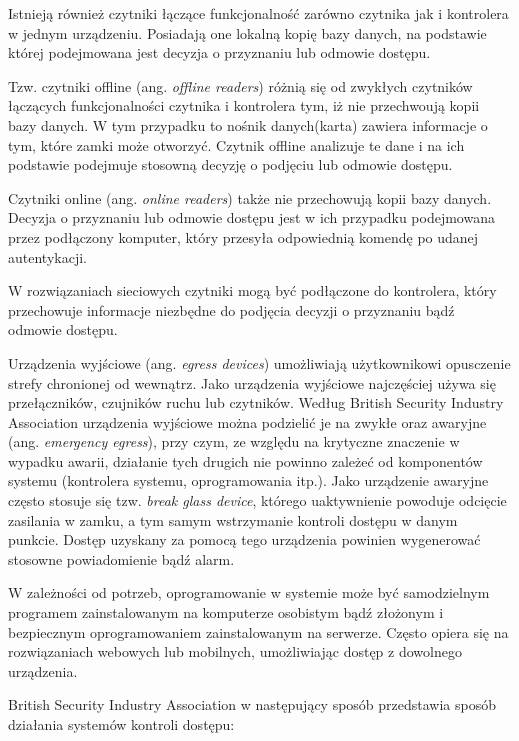 		Istnieją również czytniki łączące funkcjonalność zarówno czytnika jak i kontrolera w jednym urządzeniu. Posiadają one lokalną kopię bazy danych, na podstawie której podejmowana jest decyzja o przyznaniu lub odmowie dostępu.~\cite{bsia2016}

		Tzw. czytniki offline (ang. \textit{offline readers}) różnią się od zwykłych czytników łączących funkcjonalności czytnika i kontrolera tym, iż nie przechwoują kopii bazy danych. W tym przypadku to nośnik danych(karta) zawiera informacje o tym, które zamki może otworzyć. Czytnik offline analizuje te dane i na ich podstawie podejmuje stosowną decyzję o podjęciu lub odmowie dostępu.~\cite{bsia2016}

		Czytniki online (ang. \textit{online readers}) także nie przechowują kopii bazy danych. Decyzja o przyznaniu lub odmowie dostępu jest w ich przypadku podejmowana przez podłączony komputer, który przesyła odpowiednią komendę po udanej autentykacji.~\cite{bsia2016}

		W rozwiązaniach sieciowych czytniki mogą być podłączone do kontrolera, który przechowuje informacje niezbędne do podjęcia decyzji o przyznaniu bądź odmowie dostępu.~\cite{bsia2016}

		Urządzenia wyjściowe (ang. \textit{egress devices}) umożliwiają użytkownikowi opusczenie strefy chronionej od wewnątrz. Jako urządzenia wyjściowe najczęściej używa się przełączników, czujników ruchu lub czytników. Według British Security Industry Association urządzenia wyjściowe można podzielić je na zwykłe oraz awaryjne (ang. \textit{emergency egress}), przy czym, ze względu na krytyczne znaczenie w wypadku awarii, działanie tych drugich nie powinno zależeć od komponentów systemu (kontrolera systemu, oprogramowania itp.). Jako urządzenie awaryjne często stosuje się tzw. \textit{break glass device}, którego uaktywnienie powoduje odcięcie zasilania w zamku, a tym samym wstrzymanie kontroli dostępu w danym punkcie. Dostęp uzyskany za pomocą tego urządzenia powinien wygenerować stosowne powiadomienie bądź alarm.~\cite{bsia2016}

		W zależności od potrzeb, oprogramowanie w systemie może być samodzielnym programem zainstalowanym na komputerze osobistym bądź złożonym i bezpiecznym oprogramowaniem zainstalowanym na serwerze. Często opiera się na rozwiązaniach webowych lub mobilnych, umożliwiając dostęp z dowolnego urządzenia.~\cite{bsia2016}

		British Security Industry Association w następujący sposób przedstawia sposób działania systemów kontroli dostępu:


